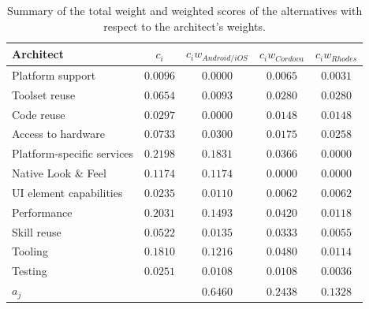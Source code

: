 \begin{table}[h]
    \begin{center}
        \begin{tabular}{lcccc}
            \hline
            \textbf{Architect}         & $c_i$    & $c_i w_{Android/iOS}$ & $c_i w_{Cordova}$  & $c_i w_{Rhodes}$ \\
            \hline
            Platform support           & $0.0096$ & $0.0000$              & $0.0065$           & $0.0031$     \\
            Toolset reuse              & $0.0654$ & $0.0093$              & $0.0280$           & $0.0280$     \\
            Code reuse                 & $0.0297$ & $0.0000$              & $0.0148$           & $0.0148$     \\
            Access to hardware         & $0.0733$ & $0.0300$              & $0.0175$           & $0.0258$     \\
            Platform-specific services & $0.2198$ & $0.1831$              & $0.0366$           & $0.0000$     \\
            Native Look \& Feel        & $0.1174$ & $0.1174$              & $0.0000$           & $0.0000$     \\
            UI element capabilities    & $0.0235$ & $0.0110$              & $0.0062$           & $0.0062$     \\
            Performance                & $0.2031$ & $0.1493$              & $0.0420$           & $0.0118$     \\
            Skill reuse                & $0.0522$ & $0.0135$              & $0.0333$           & $0.0055$     \\
            Tooling                    & $0.1810$ & $0.1216$              & $0.0480$           & $0.0114$     \\
            Testing                    & $0.0251$ & $0.0108$              & $0.0108$           & $0.0036$     \\
            \hline
            $a_j$                      &          & $0.6460$              & $0.2438$           & $0.1328$     \\
            \hline
        \end{tabular}
        \caption{Summary of the total weight and weighted scores of the alternatives with respect to the architect's weights.}
        \label{tab:total:architect}
    \end{center}
\end{table}


